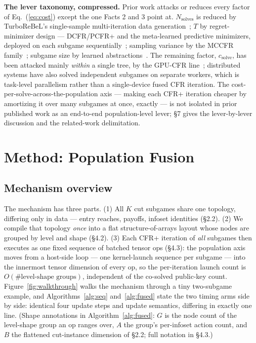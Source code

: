 \documentclass[11pt]{article}
\begin{document}
\textbf{The lever taxonomy, compressed.} Prior work attacks or reduces every factor of
Eq.~(\ref{eq:cost}) except the one Facts 2 and 3 point at. $N_{\text{solves}}$ is
reduced by TurboReBeL's single-sample multi-iteration data
generation~\citep{TurboReBeL}; $T$ by regret-minimizer design --- DCFR/PCFR+ and the
meta-learned predictive minimizers, deployed on each subgame
sequentially~\citep{BrownSandholm2019,Farina2021,Sychrovsky2024,NPCFR}; sampling
variance by the MCCFR
family~\citep{Lanctot2009,Schmid2019,McAleer2023,Steinberger2020}; subgame size by
learned abstractions~\citep{LAMIR}. The remaining factor, $c_{\text{solve}}$, has been
attacked mainly \emph{within} a single tree, by the GPU-CFR
line~\citep{Kim2024,KimSandholm2026}; distributed systems have also solved independent
subgames on separate workers, which is task-level parallelism rather than a
single-device fused CFR iteration. The cost-per-solve-across-the-population axis ---
making each CFR+ iteration cheaper by amortizing it over many subgames at once, exactly
--- is not isolated in prior published work as an end-to-end population-level lever;
\S7 gives the lever-by-lever discussion and the
related-work delimitation.

\section{Method: Population Fusion}

\subsection{Mechanism overview}

The mechanism has three parts. (1) All $K$ cut subgames share one topology,
differing only in data --- entry reaches, payoffs, infoset identities (\S2.2). (2) We
compile that topology \emph{once} into a flat structure-of-arrays layout whose nodes are
grouped by level and shape (\S4.2). (3) Each CFR+ iteration of \emph{all} subgames then
executes as one fixed sequence of batched tensor ops (\S4.3): the population axis moves
from a host-side loop --- one kernel-launch sequence per subgame --- into the innermost
tensor dimension of every op, so the per-iteration launch count is
$O(\#\text{level-shape groups})$, independent of the co-solved public-key count.
Figure~\ref{fig:walkthrough} walks the mechanism through a tiny two-subgame example, and
Algorithms~\ref{alg:seq} and~\ref{alg:fused} state the two timing arms side by side:
identical four update steps and update semantics, differing in exactly one line. (Shape
annotations in Algorithm~\ref{alg:fused}: $G$ is the node count of the level-shape group
an op ranges over, $A$ the group's per-infoset action count, and $B$ the flattened
cut-instance dimension of \S2.2; full notation in \S4.3.)
\end{document}
